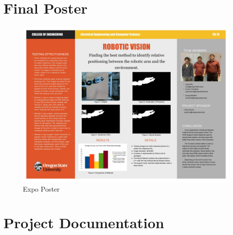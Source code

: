 \documentclass[10pt,journal,compsoc, draftclsnofoot,onecolumn]{IEEEtran}
\begin{document}
\section{Final Poster}
\begin{figure}[H]
  \begin{center}
    \includegraphics[width=1.\textwidth]{PosterNewDraft.jpg}
  \end{center}
  \caption{Expo Poster}
\end{figure}

\newpage
\section{Project Documentation}

\end{document}
